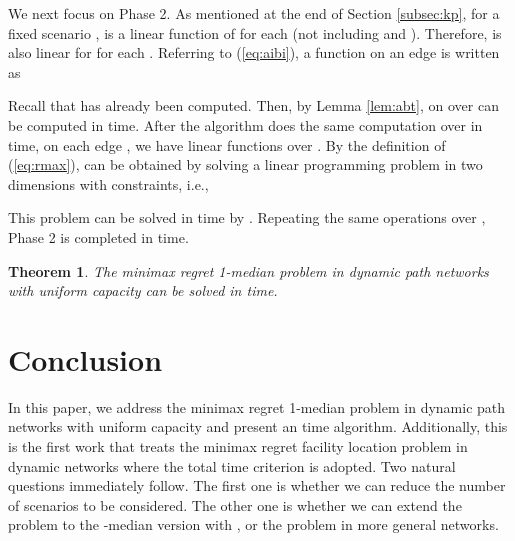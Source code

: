 \documentclass[a4paper]{llncs}
\newtheorem{thm}{Theorem}
\begin{document}
We next focus on Phase 2. 
As mentioned at the end of Section \ref{subsec:kp}, 
for a fixed scenario , 
 is a linear function of  for each  (not including  and ).
Therefore,  is also linear for  for each .
Referring to (\ref{eq:aibi}), a function  on an edge  is written as

Recall that  has already been computed.
Then, by Lemma \ref{lem:abt},  on  over  can be computed in  time.
After the algorithm does the same computation over  in  time,
on each edge ,
we have  linear functions  over .
By the definition of (\ref{eq:rmax}),  can be obtained by solving a linear programming problem in two dimensions with  constraints,
i.e.,

This problem can be solved in  time by \cite{d84}.
Repeating the same operations over , Phase 2 is completed in  time.

\begin{thm}
The minimax regret 1-median problem in dynamic path networks with uniform capacity can be solved in  time.
\label{thm:1}
\end{thm}

\section{Conclusion}
\label{sec:co}
In this paper, we address the minimax regret 1-median problem in dynamic path networks with uniform capacity and present an  time algorithm. 
Additionally, this is the first work that treats the minimax regret facility location problem in dynamic networks where the total time criterion is adopted.
Two natural questions immediately follow.
The first one is whether we can reduce the number of scenarios to be considered.
The other one is whether we can extend the problem to the -median version with ,
or the problem in more general networks.  
\end{document}
